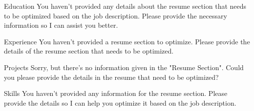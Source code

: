 \documentclass{resume}
\begin{document}
\begin{rSection}{Education}
You haven't provided any details about the resume section that needs to be optimized based on the job description. Please provide the necessary information so I can assist you better.
\end{rSection}

\begin{rSection}{Experience}
You haven't provided a resume section to optimize. Please provide the details of the resume section that needs to be optimized.
\end{rSection}

\begin{rSection}{Projects}
Sorry, but there's no information given in the "Resume Section". Could you please provide the details in the resume that need to be optimized?
\end{rSection}

\begin{rSection}{Skills}
You haven't provided any information for the resume section. Please provide the details so I can help you optimize it based on the job description.
\end{rSection}
\end{document}
